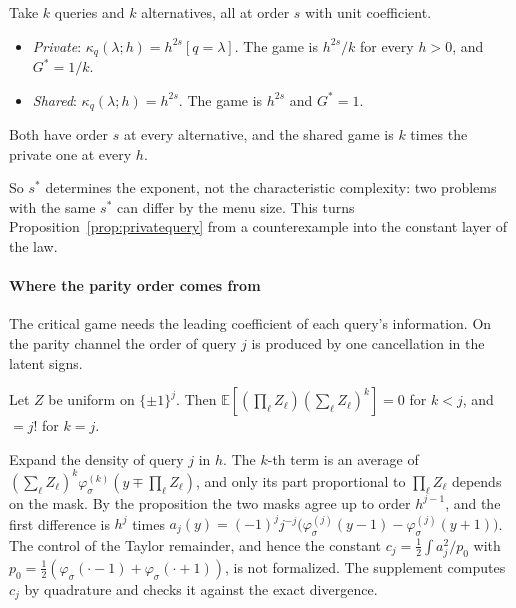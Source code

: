 \begin{proposition}
\label{prop:sameorder}
Take $k$ queries and $k$ alternatives, all at order $s$ with unit coefficient.
\begin{itemize}
\item \emph{Private}: $\kappa_q(\lambda;h)=h^{2s}[q=\lambda]$. The game is $h^{2s}/k$ for every
$h>0$, and $G^*=1/k$.
\item \emph{Shared}: $\kappa_q(\lambda;h)=h^{2s}$. The game is $h^{2s}$ and $G^*=1$.
\end{itemize}
Both have order $s$ at every alternative, and the shared game is $k$ times the private one at
every $h$.
\end{proposition}

So $s^*$ determines the exponent, not the characteristic complexity: two problems with the same
$s^*$ can differ by the menu size. This turns Proposition~\ref{prop:privatequery} from a
counterexample into the constant layer of the law.

\paragraph{Where the parity order comes from} The critical game needs the leading coefficient of
each query's information. On the parity channel the order of query $j$ is produced by one
cancellation in the latent signs.

\begin{proposition}
\label{prop:paritymoment}
Let $Z$ be uniform on $\{\pm1\}^j$. Then $\mathbb E[(\prod_\ell Z_\ell)(\sum_\ell Z_\ell)^k]=0$ for
$k<j$, and $=j!$ for $k=j$.
\end{proposition}

Expand the density of query $j$ in $h$. The $k$-th term is an average of
$(\sum_\ell Z_\ell)^k\varphi_\sigma^{(k)}(y\mp\prod_\ell Z_\ell)$, and only its part proportional to
$\prod_\ell Z_\ell$ depends on the mask. By the proposition the two masks agree up to order
$h^{j-1}$, and the first difference is $h^j$ times
$a_j(y)=(-1)^jj^{-j}\bigl(\varphi_\sigma^{(j)}(y-1)-\varphi_\sigma^{(j)}(y+1)\bigr)$. The control of
the Taylor remainder, and hence the constant
$c_j=\frac12\int a_j^2/p_0$ with $p_0=\frac12(\varphi_\sigma(\cdot-1)+\varphi_\sigma(\cdot+1))$,
is not formalized. The supplement computes $c_j$ by quadrature and checks it against the exact
divergence.

